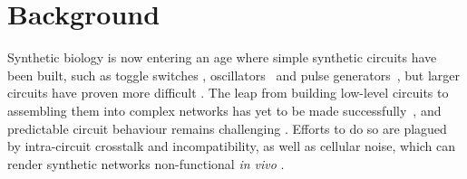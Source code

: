 % 
%
%
\section{Background}
Synthetic biology is now entering an age where simple synthetic circuits have been built, such as toggle switches \autocite{Gardner:2000vha, Kramer:2004kq, Isaacs:2003ht, Ham:2008hh, Deans:2007cya, Friedland:2009ce}, oscillators~\autocite{Stricker:2008jqa, Fung:2005jd, Tigges:2009jx} and pulse generators~\autocite{Basu:2004gn}, but larger circuits have proven more difficult \autocite{XXX}. The leap from building low-level circuits to assembling them into complex networks has yet to be made successfully~\autocite{Lu:2009ez}, and predictable circuit behaviour remains challenging \autocite{XXX}. Efforts to do so are plagued by intra-circuit crosstalk and incompatibility, as well as cellular noise, which can render synthetic networks non-functional \textit{in vivo} \autocite{XXX}. 

